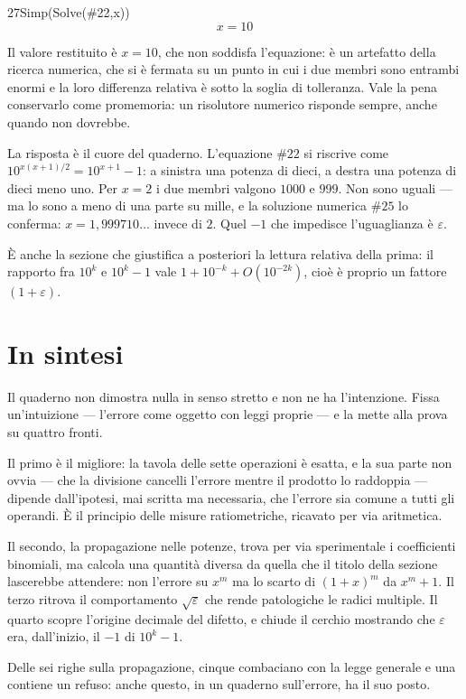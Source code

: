 \begin{espr}{27}{Simp(Solve(\#22,x))}{}
\[
x = 10
\]
\end{espr}
Il valore restituito è $x=10$, che non soddisfa l'equazione: è un artefatto della ricerca numerica, che si è fermata su un punto in cui i due membri sono entrambi enormi e la loro differenza relativa è sotto la soglia di tolleranza. Vale la pena conservarlo come promemoria: un risolutore numerico risponde sempre, anche quando non dovrebbe.


La risposta è il cuore del quaderno. L'equazione $\#22$ si riscrive come $10^{x(x+1)/2}=10^{x+1}-1$: a sinistra una potenza di dieci, a destra una potenza di dieci meno uno. Per $x=2$ i due membri valgono $1000$ e $999$. Non sono uguali — ma lo sono a meno di una parte su mille, e la soluzione numerica $\#25$ lo conferma: $x=1{,}999710\ldots$ invece di $2$. Quel $-1$ che impedisce l'uguaglianza è $\varepsilon$.

È anche la sezione che giustifica a posteriori la lettura relativa della prima: il rapporto fra $10^{k}$ e $10^{k}-1$ vale $1+10^{-k}+O(10^{-2k})$, cioè è proprio un fattore $(1+\varepsilon)$.

\section*{In sintesi}

Il quaderno non dimostra nulla in senso stretto e non ne ha l'intenzione. Fissa un'intuizione — l'errore come oggetto con leggi proprie — e la mette alla prova su quattro fronti.

Il primo è il migliore: la tavola delle sette operazioni è esatta, e la sua parte non ovvia — che la divisione cancelli l'errore mentre il prodotto lo raddoppia — dipende dall'ipotesi, mai scritta ma necessaria, che l'errore sia comune a tutti gli operandi. È il principio delle misure ratiometriche, ricavato per via aritmetica.

Il secondo, la propagazione nelle potenze, trova per via sperimentale i coefficienti binomiali, ma calcola una quantità diversa da quella che il titolo della sezione lascerebbe attendere: non l'errore su $x^m$ ma lo scarto di $(1+x)^m$ da $x^m+1$. Il terzo ritrova il comportamento $\sqrt{\varepsilon}$ che rende patologiche le radici multiple. Il quarto scopre l'origine decimale del difetto, e chiude il cerchio mostrando che $\varepsilon$ era, dall'inizio, il $-1$ di $10^{k}-1$.

Delle sei righe sulla propagazione, cinque combaciano con la legge generale e una contiene un refuso: anche questo, in un quaderno sull'errore, ha il suo posto.

